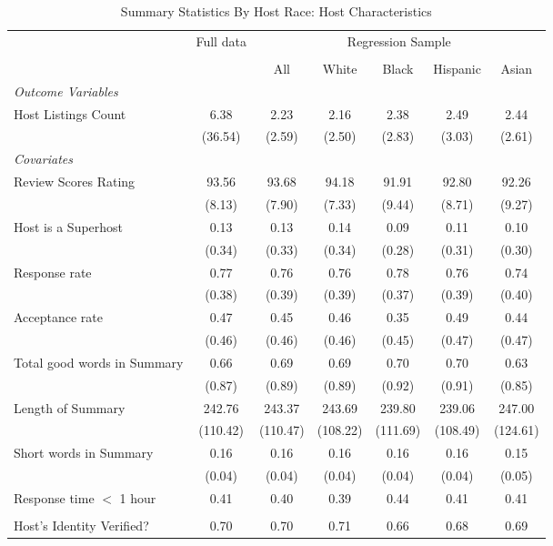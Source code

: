 \begin{table}[htbp]
\caption{Summary Statistics By Host Race: Host Characteristics}
\begin{center}%
\small\begin{tabular}{l c | c | c c c c}
& \multicolumn{1}{c}{Full data} & \multicolumn{5}{c}{Regression Sample}
\\
 \cmidrule(r){3-7}
\\
 & \multicolumn{1}{c}{} & \multicolumn{1}{c}{All} & White & Black & Hispanic & Asian
\\
\hline\hline\noalign{\smallskip} 
 \textit{\textit{Outcome Variables}} & & & & & & \\ Host Listings Count & 6.38 & 2.23 & 2.16 & 2.38 & 2.49 & 2.44 \\
 & (36.54) & (2.59) & (2.50) & (2.83) & (3.03) & (2.61) \\
 \textit{Covariates} & & & & & & \\ \hline Review Scores Rating & 93.56 & 93.68 & 94.18 & 91.91 & 92.80 & 92.26 \\
 & (8.13) & (7.90) & (7.33) & (9.44) & (8.71) & (9.27) \\
 Host is a Superhost & 0.13 & 0.13 & 0.14 & 0.09 & 0.11 & 0.10 \\
 & (0.34) & (0.33) & (0.34) & (0.28) & (0.31) & (0.30) \\
 Response rate & 0.77 & 0.76 & 0.76 & 0.78 & 0.76 & 0.74 \\
 & (0.38) & (0.39) & (0.39) & (0.37) & (0.39) & (0.40) \\
 Acceptance rate & 0.47 & 0.45 & 0.46 & 0.35 & 0.49 & 0.44 \\
 & (0.46) & (0.46) & (0.46) & (0.45) & (0.47) & (0.47) \\
 Total good words in Summary & 0.66 & 0.69 & 0.69 & 0.70 & 0.70 & 0.63 \\
 & (0.87) & (0.89) & (0.89) & (0.92) & (0.91) & (0.85) \\
 Length of Summary & 242.76 & 243.37 & 243.69 & 239.80 & 239.06 & 247.00 \\
 & (110.42) & (110.47) & (108.22) & (111.69) & (108.49) & (124.61) \\
 Short words in Summary & 0.16 & 0.16 & 0.16 & 0.16 & 0.16 & 0.15 \\
 & (0.04) & (0.04) & (0.04) & (0.04) & (0.04) & (0.05) \\
 Response time $<$ 1 hour & 0.41 & 0.40 & 0.39 & 0.44 & 0.41 & 0.41 \\  &  &  &  &  &  &  \\ Host's Identity Verified? & 0.70 & 0.70 & 0.71 & 0.66 & 0.68 & 0.69 \\

\end{tabular}
\end{center}
\end{table}
